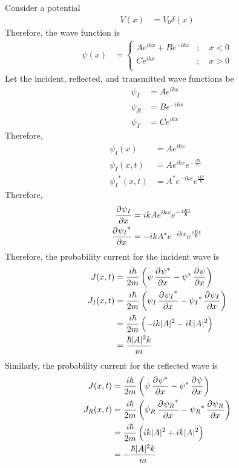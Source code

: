 \documentclass[titlepage, fleqn, a4paper, 12pt, twoside]{article}
\theoremstyle{definition}
\theoremstyle{theorem}
\begin{document}
Consider a potential
\begin{align*}
	V(x) &= V_0 \delta(x)
\end{align*}
Therefore, the wave function is
\begin{align*}
	\psi(x) &=
		\begin{cases}
			A e^{i k x} + B e^{-i k x} &;\quad x < 0\\
			C e^{i k x} &;\quad x > 0\\
		\end{cases}
\end{align*}
Let the incident, reflected, and transmitted wave functions be
\begin{align*}
	\psi_I &= A e^{i k x}\\
	\psi_R &= B e^{-i k x}\\
	\psi_T &= C e^{i k x}
\end{align*}
Therefore,
\begin{align*}
	\psi_I(x) &= A e^{i k x}\\
	\psi_I(x,t) &= A e^{i k x} e^{-\frac{i E t}{\hbar}}\\
	{\psi_I}^*(x,t) &= A^* e^{-i k x} e^{\frac{i E t}{\hbar}}
\end{align*}
Therefore,
\begin{align*}
	\dpd{\psi_I}{x} &= i k A e^{i k x} e^{-\frac{i E t}{\hbar}}\\
	\dpd{{\psi_I}^*}{x} &= -i k A^* e^{-i k x} e^{\frac{i E t}{\hbar}}
\end{align*}
Therefore, the probability current for the incident wave is
\begin{align*}
	J(x,t) &= \frac{i \hbar}{2 m} \left( \psi \dpd{\psi^*}{x} - \psi^* \dpd{\psi}{x} \right)\\
	J_I(x,t) &= \frac{i \hbar}{2 m} \left( \psi_I \dpd{{\psi_I}^*}{x} - {\psi_I}^* \dpd{\psi_I}{x} \right)\\
	&= \frac{i \hbar}{2 m} \left( -i k |A|^2 - i k |A|^2 \right)\\
	&= \frac{\hbar |A|^2 k}{m}
\end{align*}
Similarly, the probability current for the reflected wave is
\begin{align*}
	J(x,t) &= \frac{i \hbar}{2 m} \left( \psi \dpd{\psi^*}{x} - \psi^* \dpd{\psi}{x} \right)\\
	J_R(x,t) &= \frac{i \hbar}{2 m} \left( \psi_R \dpd{{\psi_R}^*}{x} - {\psi_R}^* \dpd{\psi_R}{x} \right)\\
	&= \frac{i \hbar}{2 m} \left( i k |A|^2 + i k |A|^2 \right)\\
	&= -\frac{\hbar |A|^2 k}{m}
\end{align*}
\end{document}

